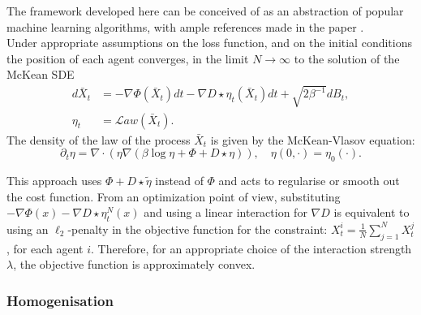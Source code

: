 \documentclass{article}
\begin{document}
The framework developed here can be conceived of as an abstraction of popular
machine learning algorithms, with ample references made in the paper \cite[p. 4]{kantas2019sharpflatshallowweaklSy}.\\

Under appropriate assumptions
on the loss function, and on the initial conditions the position of
each agent converges, in the limit $N\rightarrow\infty$ to the solution
of the McKean SDE 
\begin{align*}
d\bar{X}_{t} & =-\nabla\Phi(\bar{X}_{t})dt-\nabla D\star\eta_{t}(\bar{X}_{t})dt+\sqrt{2\beta^{-1}}dB_{t},\\
\eta_{t} & =\mathcal{L}aw\left(\bar{X}_{t}\right).
\end{align*}
The density of the law of the process $\bar{X}_{t}$ is given by the
McKean-Vlasov equation: 
\begin{equation}
\partial_{t}\eta=\nabla\cdot\left(\eta\nabla\left(\beta\log\eta+\Phi+D\star\eta\right)\right),\quad\eta(0,\cdot)=\eta_{0}(\cdot).\label{e:mc-vl}
\end{equation}

This approach uses $\Phi+D\star\tilde{\eta}$ instead of $\Phi$ and acts to regularise
or smooth out the cost function. From an optimization point of view,
substituting $-\nabla\Phi(x)-\nabla D\star\eta_{t}^{N}(x)$ and using
a linear interaction for $\nabla D$ is equivalent to using an $\ell_{2}$-penalty
in the objective function for the constraint: $X_{t}^{i}=\frac{1}{N}\sum_{j=1}^{N}X_{t}^{j}$,
for each agent $i$. Therefore, for an appropriate choice of the interaction
strength $\lambda$, the objective function is approximately convex.

\subsubsection{Homogenisation}
\end{document}

